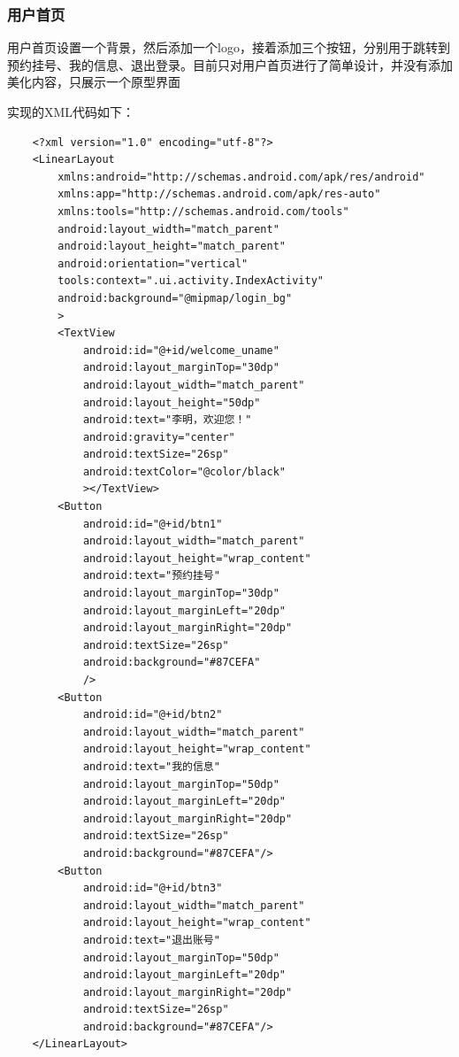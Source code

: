 \documentclass[UTF8,12pt]{article}
\begin{document}
\subsubsection{用户首页}
用户首页设置一个背景，然后添加一个logo，接着添加三个按钮，分别用于跳转到预约挂号、我的信息、退出登录。目前只对用户首页进行了简单设计，并没有添加美化内容，只展示一个原型界面

实现的XML代码如下：

\begin{lstlisting}
    <?xml version="1.0" encoding="utf-8"?>
    <LinearLayout
        xmlns:android="http://schemas.android.com/apk/res/android"
        xmlns:app="http://schemas.android.com/apk/res-auto"
        xmlns:tools="http://schemas.android.com/tools"
        android:layout_width="match_parent"
        android:layout_height="match_parent"
        android:orientation="vertical"
        tools:context=".ui.activity.IndexActivity"
        android:background="@mipmap/login_bg"
        >
        <TextView
            android:id="@+id/welcome_uname"
            android:layout_marginTop="30dp"
            android:layout_width="match_parent"
            android:layout_height="50dp"
            android:text="李明，欢迎您！"
            android:gravity="center"
            android:textSize="26sp"
            android:textColor="@color/black"
            ></TextView>
        <Button
            android:id="@+id/btn1"
            android:layout_width="match_parent"
            android:layout_height="wrap_content"
            android:text="预约挂号"
            android:layout_marginTop="30dp"
            android:layout_marginLeft="20dp"
            android:layout_marginRight="20dp"
            android:textSize="26sp"
            android:background="#87CEFA"
            />
        <Button
            android:id="@+id/btn2"
            android:layout_width="match_parent"
            android:layout_height="wrap_content"
            android:text="我的信息"
            android:layout_marginTop="50dp"
            android:layout_marginLeft="20dp"
            android:layout_marginRight="20dp"
            android:textSize="26sp"
            android:background="#87CEFA"/>
        <Button
            android:id="@+id/btn3"
            android:layout_width="match_parent"
            android:layout_height="wrap_content"
            android:text="退出账号"
            android:layout_marginTop="50dp"
            android:layout_marginLeft="20dp"
            android:layout_marginRight="20dp"
            android:textSize="26sp"
            android:background="#87CEFA"/>
    </LinearLayout>
\end{lstlisting}
\end{document}
